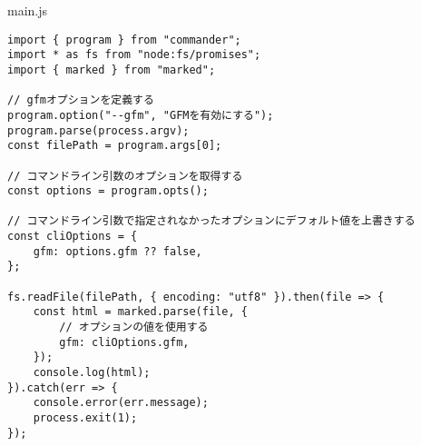 \begin{listtitle}
main.js
\end{listtitle}
\begin{lstlisting}
import { program } from "commander";
import * as fs from "node:fs/promises";
import { marked } from "marked";

// gfmオプションを定義する
program.option("--gfm", "GFMを有効にする");
program.parse(process.argv);
const filePath = program.args[0];

// コマンドライン引数のオプションを取得する
const options = program.opts();

// コマンドライン引数で指定されなかったオプションにデフォルト値を上書きする
const cliOptions = {
    gfm: options.gfm ?? false,
};

fs.readFile(filePath, { encoding: "utf8" }).then(file => {
    const html = marked.parse(file, {
        // オプションの値を使用する
        gfm: cliOptions.gfm,
    });
    console.log(html);
}).catch(err => {
    console.error(err.message);
    process.exit(1);
});
\end{lstlisting}
\listend
